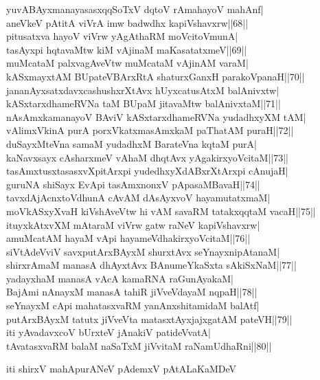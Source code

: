 \documentclass{article}
\begin{document}
yuvABAyxmanayasasxqqSoTxV dqtoV rAmahayoV mahAnf|\\
aneVkeV pAtitA viVrA imw badwdhx kapiVshavxrw||68||\\
pitusatxva hayoV viVrw yAgAthaRM moVcitoVmunA|\\
tasAyxpi hqtavaMtw kiM vAjinaM maKasatatxmeV||69||\\
muMcataM palxvagAveVtw muMcataM vAjinAM varaM|\\
kASxmayxtAM BUpateVBArxRtA shaturxGanxH parakoVpanaH||70||\\
jananAyxsatxdavxcashushxrXtAvx hUyxcatusAtxM balAnivxtw|\\
kASxtarxdhameRVNa taM BUpaM jitavaMtw balAnivxtaM||71||\\
nAsAmxkamanayoV BAviV kASxtarxdhameRVNa yudadhxyXM tAM|\\
vAlimxVkinA purA porxVkatxmasAmxkaM paThatAM puraH||72||\\
duSayxMteVna samaM yudadhxM BarateVna kqtaM purA|\\
kaNavxsayx cAsharxmeV vAhaM dhqtAvx yAgakirxyoVcitaM||73||\\
tasAmxtusxtasasxvXpitArxpi yudedhxyXdABxrXtArxpi cAnujaH|\\
guruNA shiSayx EvApi tasAmxnonxV pApasaMBavaH||74||\\
tavxdAjAcnxtoVdhunA cAvAM dAsAyxvoV hayamutatxmaM|\\
moVkASxyXvaH kiVshAveVtw hi vAM savaRM tatakxqqtaM vacaH||75||\\
ituyxkAtxvXM mAtaraM viVrw gatw raNeV kapiVshavxrw|\\
amuMcatAM hayaM vApi hayameVdhakirxyoVcitaM||76||\\
siVtAdeVviV savxputArxBAyxM shurxtAvx seYnayxnipAtanaM|\\
shirxrAmaM manasA dhAyxtAvx BAnumeYkaSxta sAkiSxNaM||77||\\
yadayxhaM manasA vAcA kamaRNA raGunAyakaM|\\
BajAmi nAnayxM manasA tahiR jiVveVdayaM nqpaH||78||\\
seYnayxM cApi mahatasxvaRM yanAnxshitamidaM balAtf|\\
putArxBAyxM tatutx jiVveVta matasxtAyxjajxgatAM pateVH||79||\\
iti yAvadavxcoV bUrxteV jAnakiV patideVvatA|\\
tAvatasxvaRM balaM naSaTxM jiVvitaM raNamUdhaRni||80||\\

\begin{center}
iti shirxV mahApurANeV pAdemxV pAtALaKaMDeV
\end{center}
\end{document}
